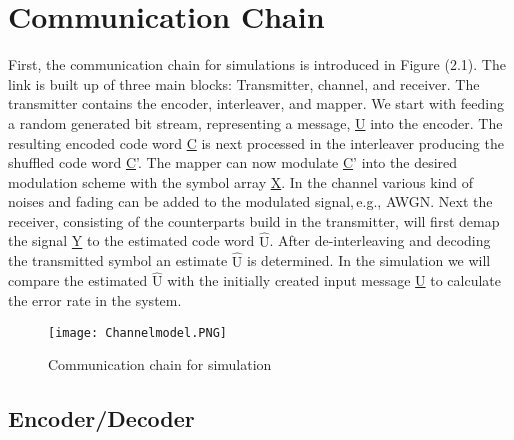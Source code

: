 \chapter{Communication Chain} 
\label{chap:commchain}
\graphicspath{{C:/Users/Kevin/Bachelarbeit/Bachelorarbeit/01_Bachelorarbeit_LaTex/02_Figures/}}


First, the communication chain for simulations is introduced in Figure (2.1). The link is built up of three main blocks: Transmitter, channel, and receiver. The transmitter contains the encoder, interleaver, and mapper. We start with feeding a random generated bit stream, representing a message, \underline{U} into the encoder. The resulting encoded code word \underline{C} is next processed in the interleaver producing the shuffled code word \underline{C}'. The mapper can now modulate \underline{C}' into the desired modulation scheme with the symbol array \underline{X}. In the channel various kind of noises and fading can be added to the modulated signal,\,e.g., \gls{AWGN}. Next the receiver, consisting of the counterparts build in the transmitter, will first demap the signal \underline{Y} to the estimated code word \underline{$\hat{\textrm{U}}$}. After de-interleaving and decoding the transmitted symbol an estimate \underline{$\hat{\textrm{U}}$} is determined. In the simulation we will compare the estimated \underline{$\hat{\textrm{U}}$} with the initially created input message \underline{U} to calculate the error rate in the system.
\begin{figure}[!htb]
	\centering
	\texttt{[image: Channelmodel.PNG]}
	\caption{Communication chain for simulation}
	\label{fig:commchain}
\end{figure}

\section{Encoder/Decoder}
\label{sec:enc}

